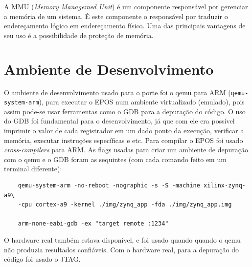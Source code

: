 A MMU (\emph{Memory Managemed Unit}) é um componente responsável por gerenciar a memória de um sistema. É este componente o responsável por traduzir o endereçamento lógico em endereçamento físico. Uma das principais vantagens de seu uso é a possibilidade de proteção de memória.

\section{Ambiente de Desenvolvimento}

O ambiente de desenvolvimento usado para o porte foi o qemu para ARM (\verb+qemu-system-arm+), para executar o EPOS num ambiente virtualizado (emulado), pois assim pode-se usar ferramentas como o GDB para a depuração do código. O uso do GDB foi fundamental para o desenvolvimento, já que com ele era possível imprimir o valor de cada registrador em um dado ponto da execução, verificar a memória, executar instruções específicas e etc. Para compilar o EPOS foi usado \emph{cross-compilers} para ARM. As flags usadas para criar um ambiente de depuração com o qemu e o GDB foram as sequintes (com cada comando feito em um terminal diferente):
\begin{verbatim}
	qemu-system-arm -no-reboot -nographic -s -S -machine xilinx-zynq-a9\
	-cpu cortex-a9 -kernel ./img/zynq_app -fda ./img/zynq_app.img

	arm-none-eabi-gdb -ex "target remote :1234"
\end{verbatim}

O hardware real também estava disponível, e foi usado quando quando o qemu não produzia resultados confiáveis. Com o hardware real, para a depuração do código foi usado o JTAG.
